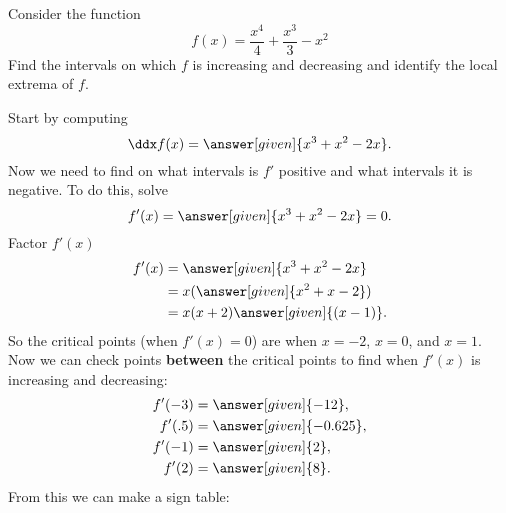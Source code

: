\documentclass{ximera}
\begin{document}
\begin{example}\label{E:localextrema}
Consider the function 
\[
f(x) = \frac{x^4}{4}+\frac{x^3}{3}-x^2
\]
Find the intervals on which $f$ is increasing and decreasing and
identify the local extrema of $f$.


\begin{explanation}
Start by computing
\[
\ddx f(x) = \answer[given]{x^3+x^2-2x}.
\]
Now we need to find on what intervals is $f'$ positive and what intervals it is
negative. To do this, solve 
\[
f'(x) = \answer[given]{x^3+x^2-2x} =0.
\]
Factor $f'(x)$
\begin{align*}
f'(x) &= \answer[given]{x^3+x^2-2x} \\
&=x(\answer[given]{x^2+x-2})\\
&=x(x+2)\answer[given]{(x-1)}.
\end{align*}
So the critical points (when $f'(x)=0$) are when $x=-2$, $x=0$, and
$x=1$. Now we can check points \textbf{between} the critical points to find
when $f'(x)$ is increasing and decreasing:
\begin{align*}
  f'(-3)&=\answer[given]{-12},\\
  f'(.5)&=\answer[given]{-0.625},\\
  f'(-1)&=\answer[given]{2},\\
  f'(2)&=\answer[given]{8}.
\end{align*}
From this we can make a sign table:

\begin{image}
\end{image}
\end{explanation}
\end{example}
\end{document}
